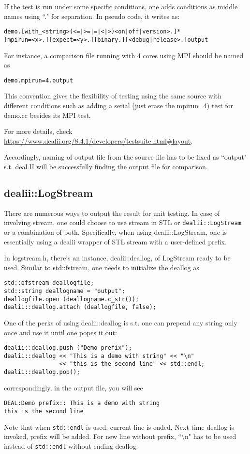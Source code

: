 \documentclass[openany]{book}
\begin{document}
If the test is run under some specific conditions, one adds conditions as
middle names using ``." for separation. In pseudo code, it writes as:
\begin{lstlisting}
demo.[with_<string>(<=|>=|=|<|>)<on|off|version>.]*
[mpirun=<x>.][expect=<y>.][binary.][<debug|release>.]output
\end{lstlisting}
For instance, a comparison file running with 4 cores using MPI should be named as
\begin{lstlisting}
demo.mpirun=4.output
\end{lstlisting}

This convention gives the flexibility of testing using the same source with different conditions such as adding a serial (just erase the mpirun=4) test for demo.cc besides its MPI test.

For more details, check \url{https://www.dealii.org/8.4.1/developers/testsuite.html#layout}.

Accordingly, naming of output file from the source file has to be fixed as  ``output" s.t. deal.II will be successfully finding the output file for comparison.
\subsection{dealii::LogStream}
There are numerous ways to output the result for unit testing. In case of involving stream, one could choose to use stream in STL or {\tt dealii::LogStream} or a combination of both. Specifically, when using dealii::LogStream, one is essentially using a dealii wrapper of STL stream with a user-defined prefix.

In logstream.h, there's an instance, dealii::deallog, of LogStream ready to be used. Similar to std::fstream, one needs to initialize the deallog as
\begin{lstlisting}
std::ofstream deallogfile;
std::string deallogname = "output";
deallogfile.open (deallogname.c_str());
dealii::deallog.attach (deallogfile, false);
\end{lstlisting} 

One of the perks of using dealii::deallog is s.t. one can prepend any string only once and use it until one popes it out:
\begin{lstlisting}
dealii::deallog.push ("Demo prefix");
dealii::deallog << "This is a demo with string" << "\n"
                << "this is the second line" << std::endl;
dealii::deallog.pop();
\end{lstlisting}
correspondingly, in the output file, you will see
\begin{verbatim}
DEAL:Demo prefix:: This is a demo with string
this is the second line
\end{verbatim}
Note that when {\tt std::endl} is used, current line is ended. Next time deallog is invoked, prefix will be added. For new line without prefix, ``\textbackslash n" has to be used instead of {\tt std::endl} without ending deallog.
\end{document}

